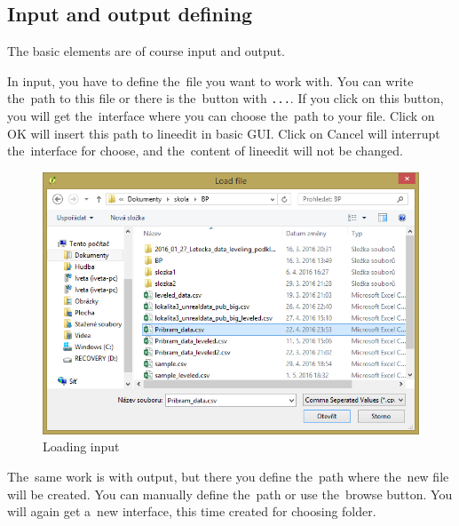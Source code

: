\subsection{Input and output defining}
\label{input-output}

The basic elements are of course input and output. 

In input, you have to define the~file you want to work with. You can write the~path to this file or
there is the~button with {\tt ...}. If you click on this button, you will get the~interface where
you can choose the~path to your file. Click on OK will insert this path to lineedit in basic GUI. Click
on Cancel will interrupt the~interface for choose, and the~content of lineedit will not be changed. 

  \begin{figure}[H]
   \centering
	\includegraphics[scale=0.75]{./pictures/input.png}
	\caption[Loading input]{Loading input}
      \label{fig:input}
  \end{figure}

The~same work is with output, but there you define the~path where the~new file will be created.
You can manually define the~path or use the~browse button. You will again get a~new interface, this
time created for choosing folder. 

